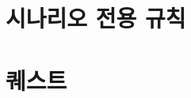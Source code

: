 \documentclass{report}
\begin{document}
	\hypertarget{scenario-rule}{}
	\section{시나리오 전용 규칙}
	
	\hypertarget{quest}{}
	\section{퀘스트}
	
\end{document}
